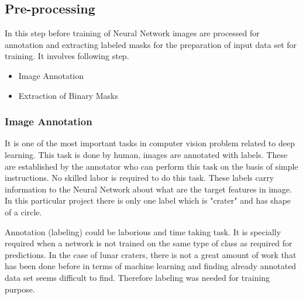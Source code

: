 \documentclass[11pt]{article}
\begin{document}
\subsection{Pre-processing}
In this step before training of Neural Network images are processed for annotation and extracting labeled masks for the preparation of input data set for training. It involves following step.

\begin{itemize}
\item {Image Annotation}
\item {Extraction of Binary Masks}
\end{itemize}

\subsubsection{Image Annotation}
It is one of the most important tasks in computer vision problem related to deep learning. This task is done by human, images are annotated with labels. These are established by the annotator who can perform this task on the basis of simple instructions. No skilled labor is required to do this task. These labels carry information to the Neural Network about what are the target features in image. In this particular project there is only one label which is "crater" and has shape of a circle.
 
Annotation (labeling) could be laborious and time taking task. It is specially required when a network is not trained on the same type of class as required for predictions. In the case of lunar craters, there is not a great amount of work that has been done before in terms of machine learning and finding already annotated data set seems difficult to find. Therefore labeling was needed for training purpose. 

\end{document}
